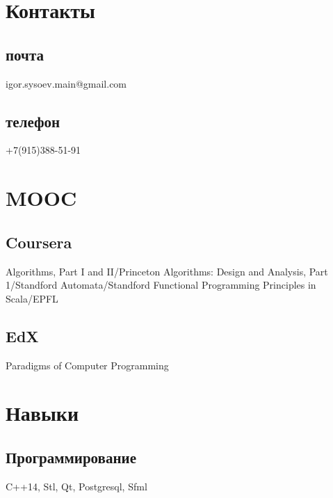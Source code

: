 \documentclass[a4paper]{curricula-vitae}
\begin{document}




\begin{minipage}[t]{0.33\textwidth} %

\section{Контакты} 
\subsection{почта}
igor.sysoev.main@gmail.com
\subsection{телефон}
+7(915)388-51-91

\section{MOOC}
\subsection{Coursera}
Algorithms, Part I and II/Princeton
Algorithms: Design and Analysis, Part 1/Standford
Automata/Standford
Functional Programming Principles in Scala/EPFL

\subsection{EdX}
Paradigms of Computer Programming

\section{Навыки}

\subsection{Программирование}
C++14, Stl, Qt,
Postgresql, Sfml


\end{minipage}
\end{document}
